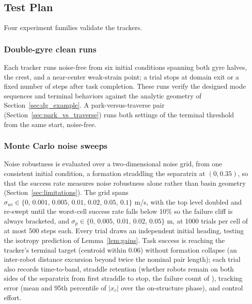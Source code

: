 \documentclass[lettersize,journal]{IEEEtran}
\begin{document}
\subsection{Test Plan}
\label{sec:test_plan}

Four experiment families validate the trackers.

\subsubsection{Double-gyre clean runs}
Each tracker runs noise-free from six initial conditions spanning both
gyre halves, the crest, and a near-center weak-strain point; a trial
stops at domain exit or a fixed number of steps after task completion.
These runs verify the designed mode sequences and terminal behaviors
against the analytic geometry of Section~\ref{sec:dg_example}. A
park-versus-traverse pair (Section~\ref{sec:park_vs_traverse}) runs
both settings of the terminal threshold from the same start,
noise-free.

\subsubsection{Monte Carlo noise sweeps}
Noise robustness is evaluated over a two-dimensional noise grid, from
one consistent initial condition, a formation straddling the
separatrix at $(0, 0.35)$, so that the success rate measures noise
robustness alone rather than basin geometry
(Section~\ref{sec:limitations}). The grid spans $\sigma_{uv} \in \{0,\,
0.001,\, 0.005,\, 0.01,\, 0.02,\, 0.05,\, 0.1\}$ m/s, with the top
level doubled and re-swept until the worst-cell success rate falls
below 10\% so the failure cliff is always bracketed, and $\sigma_p \in
\{0,\, 0.005,\, 0.01,\, 0.02,\, 0.05\}$ m, at 1000 trials per cell of
at most 500 steps each. Every trial draws an independent initial
heading, testing the isotropy prediction of Lemma~\ref{lem:gains}.
Task success is reaching the tracker's terminal target (centroid
within 0.06) without formation collapse (an inter-robot distance
excursion beyond twice the nominal pair length); each trial also
records time-to-band, straddle retention (whether robots remain on
both sides of the separatrix from first straddle to stop, the failure
count of \cite{9}), tracking error (mean and 95th percentile of
$|x_c|$ over the on-structure phase), and control effort.
\end{document}
